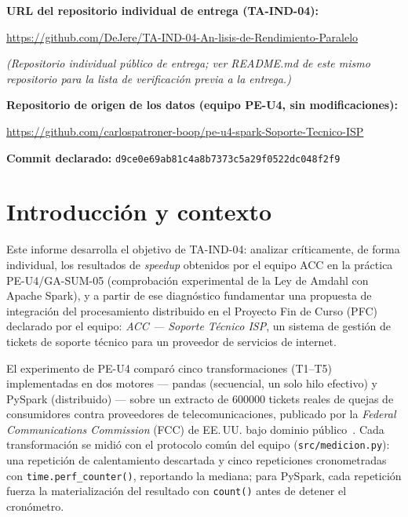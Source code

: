 \documentclass[11pt,a4paper]{article}
\newcommand{\repoteam}{\url{https://github.com/carlospatroner-boop/pe-u4-spark-Soporte-Tecnico-ISP}}
\newcommand{\committeam}{\texttt{d9ce0e69ab81c4a8b7373c5a29f0522dc048f2f9}}
\begin{document}
\begin{titlepage}
\vspace{1.2cm}
\textbf{URL del repositorio individual de entrega (TA-IND-04):}\par
\vspace{0.2cm}
\url{https://github.com/DeJere/TA-IND-04-An-lisis-de-Rendimiento-Paralelo}\par
\textit{\small (Repositorio individual p\'ublico de entrega; ver README.md de este mismo repositorio para la lista de verificaci\'on previa a la entrega.)}

\vspace{1.2cm}
\textbf{Repositorio de origen de los datos (equipo PE-U4, sin modificaciones):}\par
\vspace{0.2cm}
\repoteam\par
\textbf{Commit declarado:} \committeam

\end{titlepage}

\section{Introducci\'on y contexto}

Este informe desarrolla el objetivo de TA-IND-04: analizar cr\'iticamente, de forma
individual, los resultados de \textit{speedup} obtenidos por el equipo ACC en la pr\'actica
PE-U4/GA-SUM-05 (comprobaci\'on experimental de la Ley de Amdahl con Apache Spark), y a
partir de ese diagn\'ostico fundamentar una propuesta de integraci\'on del procesamiento
distribuido en el Proyecto Fin de Curso (PFC) declarado por el equipo: \textit{ACC ---
Soporte T\'ecnico ISP}, un sistema de gesti\'on de tickets de soporte t\'ecnico para un
proveedor de servicios de internet.

El experimento de PE-U4 compar\'o cinco transformaciones (T1--T5) implementadas en dos
motores --- pandas (secuencial, un solo hilo efectivo) y PySpark (distribuido) --- sobre un
extracto de \num{600000} tickets reales de quejas de consumidores contra proveedores de
telecomunicaciones, publicado por la \textit{Federal Communications Commission} (FCC) de
EE.\,UU. bajo dominio p\'ublico~\cite{fccdataset2026}. Cada transformaci\'on se midi\'o con
el protocolo com\'un del equipo (\texttt{src/\allowbreak{}medicion.py}): una repetici\'on de calentamiento
descartada y cinco repeticiones cronometradas con \texttt{time.perf\_counter()}, reportando
la mediana; para PySpark, cada repetici\'on fuerza la materializaci\'on del resultado con
\texttt{count()} antes de detener el cron\'ometro.
\end{document}
